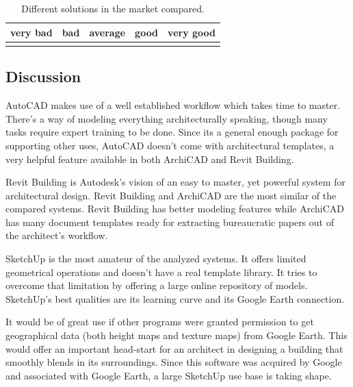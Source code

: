 \vspace{-0.5cm}
\begin{table}[!ht]
  \centering
	\begin{tabular}{|p{1.1cm}|p{1.1cm}|p{1.1cm}|p{1.1cm}|p{1.1cm}|}
		\hline
		\scriptsize{very bad}	& \scriptsize{bad}			& \scriptsize{average}	& \scriptsize{good}		& \scriptsize{very good}	\\
		\hline
		\GdE									&	\GdD									&	\GdC									&	\GdB								&	\GdA			\\
		\hline
	\end{tabular}
  \caption{Different solutions in the market compared.}
  \label{TB-COMP-SOL}
\end{table}

\subsection{Discussion}
AutoCAD makes use of a well established workflow which takes time to master.
There's a way of modeling everything architecturally speaking, though many
tasks require expert training to be done.
Since its a general enough package for supporting other uses,
AutoCAD doesn't come with architectural templates,
a very helpful feature available in both ArchiCAD and Revit Building.

Revit Building is Autodesk's vision of an easy to master,
yet powerful system for architectural design.
Revit Building and ArchiCAD are the most similar of the compared systems.
Revit Building has better modeling features while ArchiCAD has many document templates
ready for extracting bureaucratic papers out of the architect's workflow.

SketchUp is the most amateur of the analyzed systems.
It offers limited geometrical operations and doesn't have a real template library.
It tries to overcome that limitation by offering a large online repository of models.
SketchUp's best qualities are its learning curve and its Google Earth connection.

It would be of great use if other programs were granted permission to get geographical
data (both height maps and texture maps) from Google Earth.
This would offer an important head-start for an architect in designing a building that
smoothly blends in its surroundings.
Since this software was acquired by Google and associated with Google Earth,
a large SketchUp use base is taking shape.

